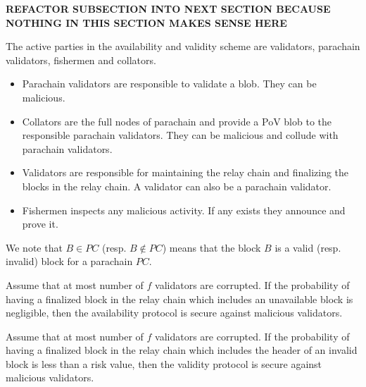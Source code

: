 {\bf REFACTOR SUBSECTION INTO NEXT SECTION BECAUSE NOTHING IN THIS SECTION MAKES SENSE HERE}



The active parties in the availability and validity scheme are validators, parachain validators, fishermen and collators. 


\begin{itemize}
\item Parachain validators are responsible to validate a blob. They can be malicious.
\item Collators are the full nodes of parachain and provide a PoV blob to the responsible parachain validators. They can be malicious and collude with parachain validators.
\item Validators are responsible for maintaining the relay chain and finalizing the blocks in the relay chain. A validator can also be a parachain validator. 
\item Fishermen inspects any malicious activity. If any exists they announce and prove it.  
\end{itemize}


We note that $B\in PC$ (resp. $B \notin PC$) means that the block $B$ is a valid (resp. invalid) block for a parachain $PC$.


\begin{definition}
Assume that at most number of $f$ validators are corrupted. If the probability of having a finalized block in the relay chain which includes an unavailable block is negligible, then the availability protocol is secure against malicious validators.
\end{definition}

\begin{definition}
Assume that  at most number of $f$ validators are corrupted. If the probability of having a finalized block in the relay chain which includes the header of an invalid block is less than a risk value, then the validity protocol is secure against malicious validators.
\end{definition}






